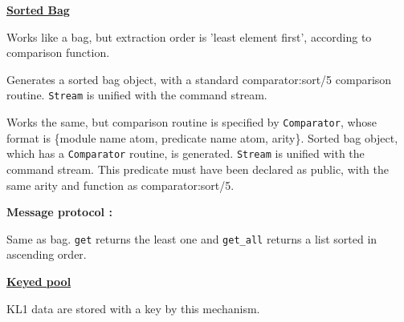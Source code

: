 \noindent\underline{\bf Sorted Bag}\vspace{1ex}\par
Works like a bag, but extraction order is 'least element first', according
to comparison function.
\begin{itemize}

Generates a sorted bag object, with a standard comparator:sort/5 comparison
routine. \verb|Stream| is unified with the command stream.

Works the same, but comparison routine is specified by \verb|Comparator|, whose
format is \{module name atom, predicate name atom, arity\}. 
Sorted bag object, which has a \verb|Comparator| routine, is generated. 
\verb|Stream| is unified with the command stream. This predicate
must have been declared as public, with the same arity and function as
comparator:sort/5.

\end{itemize}
{\bf Message protocol :}\par
Same as bag. \verb|get| returns the least one and \verb|get_all| returns a
list sorted in ascending order.
\vspace{1ex}

\noindent\underline{\bf Keyed pool}\vspace{1ex}\par
KL1 data are stored with a key by this mechanism.
\vspace{1ex}

